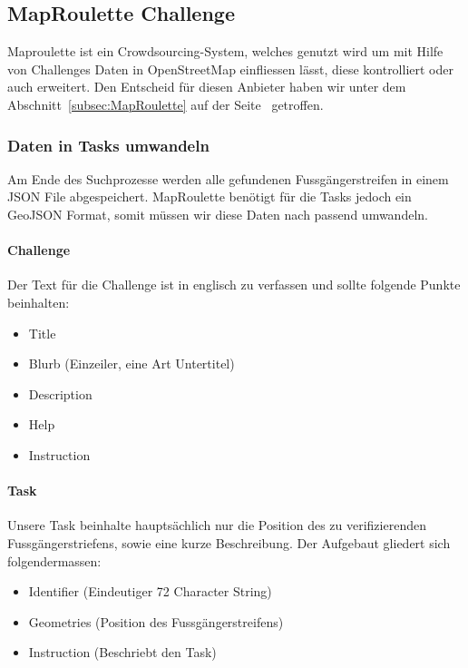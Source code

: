 \subsection{MapRoulette Challenge}
Maproulette ist ein Crowdsourcing-System, welches genutzt wird um mit Hilfe von Challenges Daten in OpenStreetMap einfliessen lässt, diese kontrolliert oder auch erweitert. Den Entscheid für diesen Anbieter haben wir unter dem Abschnitt~\ref{subsec:MapRoulette} auf der Seite~\pageref{subsec:MapRoulette} getroffen.

\subsubsection{Daten in Tasks umwandeln}
Am Ende des Suchprozesse werden alle gefundenen Fussgängerstreifen in einem JSON File abgespeichert. MapRoulette benötigt für die Tasks jedoch ein GeoJSON Format, somit müssen wir diese Daten nach passend umwandeln. 

\paragraph{Challenge} Der Text für die Challenge ist in englisch zu verfassen und sollte folgende Punkte beinhalten:
\begin{itemize}
	\item Title
	\item Blurb (Einzeiler, eine Art Untertitel)
	\item Description
	\item Help
	\item Instruction
\end{itemize}

\paragraph{Task} Unsere Task beinhalte hauptsächlich nur die Position des zu verifizierenden Fussgängerstriefens, sowie eine kurze Beschreibung. Der Aufgebaut gliedert sich folgendermassen:
\begin{itemize}
	\item Identifier (Eindeutiger 72 Character String)
	\item Geometries (Position des Fussgängerstreifens)
	\item Instruction (Beschriebt den Task)
\end{itemize}